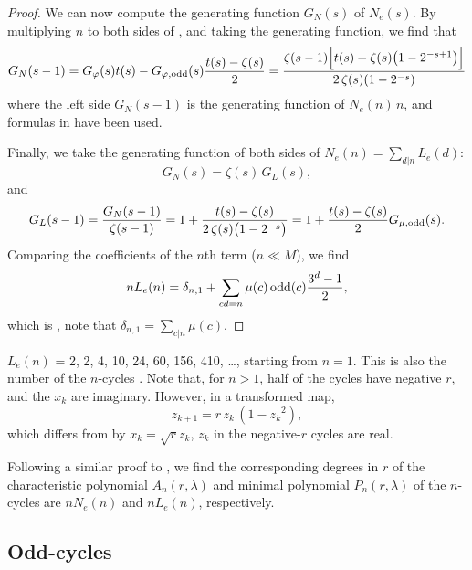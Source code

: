 \documentclass{ws-ijbc}
\begin{document}
\begin{proof}
We can now compute the generating function $G_N(s)$ of $N_e(s)$.
By multiplying $n$ to both sides of ,
and taking the generating function,
we find that
\begin{align*}
  G_N(s - 1)
    = G_\varphi(s) t(s)- G_{\varphi, \mathrm{odd}}(s) \frac{t(s)-\zeta(s)}{2}
    =
      \frac{\zeta(s-1) \Big[ t(s) + \zeta(s) \big( 1  - 2^{-s+1} \big) \Big]  }
           {2 \, \zeta(s) (1 - 2^{-s}) }
\end{align*}
where the left side $G_N(s-1)$ is
  the generating function of $N_e(n) \, n$,
and formulas in  have been used.

Finally, we take the generating function of both sides of
 $N_e(n) = \sum_{d|n} L_e(d)$:
\[
  G_N(s) = \zeta(s) \, G_L(s),
\]
and
\begin{align*}
  G_L(s-1) = \frac{G_N(s - 1)}{\zeta(s-1)}
       = 1
        + \frac{ t(s) - \zeta(s) }
          {2 \, \zeta(s) \big(1 - 2^{-s}\big)}
       = 1 + \frac{t(s) - \zeta(s)}{2} G_{\mu, \mathrm{odd}}(s).
\end{align*}
Comparing the coefficients of the $n$th term ($n \ll M$),
  we find
\[
  n L_e(n) = \delta_{n,1} + \sum_{cd = n} \mu(c) \, \mathrm{odd}(c) \frac{3^d-1}{2},
\]
which is , note that $\delta_{n,1} = \sum_{c|n}\mu(c)$.
%
\end{proof}


%
$L_e(n)$ = 2, 2, 4, 10, 24, 60, 156, 410, \ldots, starting from $n = 1$.
%
This is also the number of the $n$-cycles \cite{hao, hao2}.
Note that, for $n>1$, half of the cycles have negative $r$,
and the $x_k$ are imaginary.
However, in a transformed map,
\[
z_{k+1} = r \, z_k \, (1 - {z_k}^2),
\]
which differs from  by $x_k = \sqrt{r} z_k$,
$z_k$ in the negative-$r$ cycles are real.



Following a similar proof to ,
we find the corresponding degrees in $r$
of the characteristic polynomial $A_n(r, \lambda)$
  and minimal polynomial $P_n(r, \lambda)$ of the $n$-cycles
are $n N_e(n)$ and $n L_e(n)$, respectively.


\subsection{\label{sec:oddcycle}Odd-cycles}
\end{document}
